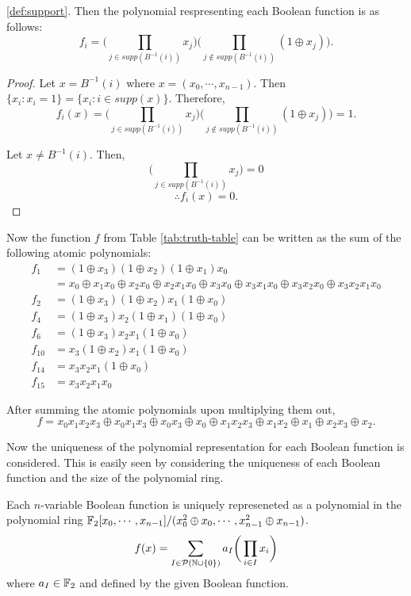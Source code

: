 \ref{def:support}. Then the polynomial respresenting each Boolean function
is as follows:
\begin{equation}\label{eqn:atomic-ANF}
  f_i=\bigg(\prod_{j\in supp(B^{-1}(i))}x_j\bigg)
    \bigg(\prod_{j\not\in supp(B^{-1}(i))}(1\oplus x_j)\bigg).
\end{equation}
\begin{proof}
  Let $x=B^{-1}(i)$ where $x=(x_0,\cdots,x_{n-1})$. Then
  $\{x_i:x_i=1\}=\{x_i:i\in supp(x)\}$. Therefore,
  \[
  f_i(x)=\bigg(\prod_{j\in supp(B^{-1}(i))}x_j\bigg)
    \bigg(\prod_{j\not\in supp(B^{-1}(i))}(1\oplus x_j)\bigg)=1.
  \]

  Let $x\not=B^{-1}(i)$. Then,
  \[
  \bigg(\prod_{j\in supp(B^{-1}(i))}x_j\bigg)=0
  \]\[
  \therefore f_i(x)=0.
  \]
\end{proof}

\par Now the function $f$ from Table \ref{tab:truth-table} can be written as
the sum of the following atomic polynomials:
\begin{align*}
  f_1   &=(1\oplus x_3)(1\oplus x_2)(1\oplus x_1)x_0\\
        &=x_0 \oplus x_1x_0 \oplus x_2x_0 \oplus x_2x_1x_0 \oplus
          x_3x_0 \oplus x_3x_1x_0 \oplus x_3x_2x_0 \oplus x_3x_2x_1x_0\\
  f_2   &=(1\oplus x_3)(1\oplus x_2)x_1(1\oplus x_0)\\
  f_4   &=(1\oplus x_3)x_2(1\oplus x_1)(1\oplus x_0)\\
  f_6   &=(1\oplus x_3)x_2x_1(1\oplus x_0)\\
  f_{10}&=x_3(1\oplus x_2)x_1(1\oplus x_0)\\
  f_{14}&=x_3x_2x_1(1\oplus x_0)\\
  f_{15}&=x_3x_2x_1x_0
\end{align*}
\par After summing the atomic polynomials upon multiplying them out,
\[
	f=x_0x_1x_2x_3\oplus x_0x_1x_3 \oplus x_0x_3 \oplus x_0 \oplus x_1x_2x_3
    \oplus x_1x_2\oplus x_1\oplus x_2x_3 \oplus x_2.
\]

\par Now the uniqueness of the polynomial representation for each Boolean
function is considered. This is easily seen by considering the uniqueness of
each Boolean function and the size of the polynomial ring.

\begin{theorem}
Each $n$-variable Boolean function is uniquely represeneted as a polynomial
in the polynomial ring $\mathbb{F}_2[x_0,\cdots,x_{n-1}]/ (x_0^2\oplus x_0,\cdots,
x_{n-1}^2 \oplus x_{n-1})$.
\begin{equation}\label{eqn:ANF}
  f(x)=\sum_{I\in\mathcal{P}(\mathbb{N}\cup\{0\})}a_I\bigg(\prod_{i\in I}x_i\bigg)
\end{equation}
where $a_I\in\mathbb{F}_2$ and defined by the given Boolean function.
\end{theorem}

